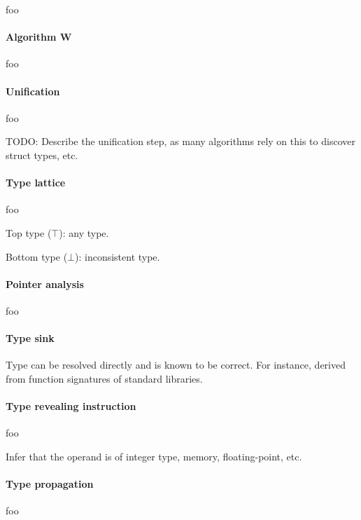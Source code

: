 \documentclass[10pt, a4paper, sigplan, authordraft]{acmart}
\begin{document}
foo

\paragraph{Algorithm W}

foo

\paragraph{Unification}

foo

TODO: Describe the unification step, as many algorithms rely on this to discover struct types, etc.

\paragraph{Type lattice}

foo

Top type ($\top$): any type.

Bottom type ($\bot$): inconsistent type.

\paragraph{Pointer analysis}

foo

\paragraph{Type sink}


Type can be resolved directly and is known to be correct. For instance, derived from function signatures of standard libraries.

\paragraph{Type revealing instruction}

foo


Infer that the operand is of integer type, memory, floating-point, etc.


\paragraph{Type propagation}

foo
\end{document}
